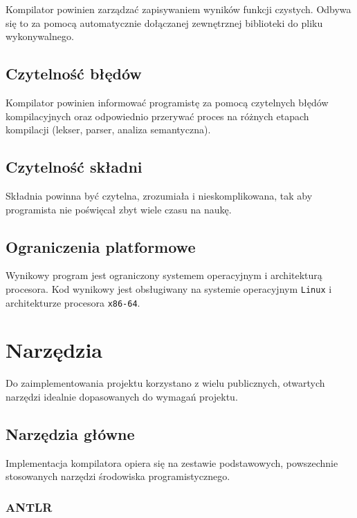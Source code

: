 Kompilator powinien zarządzać zapisywaniem wyników funkcji czystych. Odbywa się to za pomocą automatycznie dołączanej zewnętrznej biblioteki do pliku wykonywalnego.

\subsection{Czytelność błędów}

Kompilator powinien informować programistę za pomocą czytelnych błędów kompilacyjnych oraz odpowiednio przerywać proces na różnych etapach kompilacji (lekser, parser, analiza semantyczna).

\subsection{Czytelność składni}

Składnia powinna być czytelna, zrozumiała i nieskomplikowana, tak aby programista nie poświęcał zbyt wiele czasu na naukę.

\newpage
\subsection{Ograniczenia platformowe}

Wynikowy program jest ograniczony systemem operacyjnym i architekturą procesora. Kod wynikowy jest obsługiwany na systemie operacyjnym \verb|Linux| i architekturze procesora \verb|x86-64|.

\section{Narzędzia}

Do zaimplementowania projektu korzystano z wielu publicznych, otwartych narzędzi idealnie dopasowanych do wymagań projektu.

\subsection{Narzędzia główne}

Implementacja kompilatora opiera się na zestawie podstawowych, powszechnie stosowanych narzędzi środowiska programistycznego.

\subsubsection{ANTLR} %

